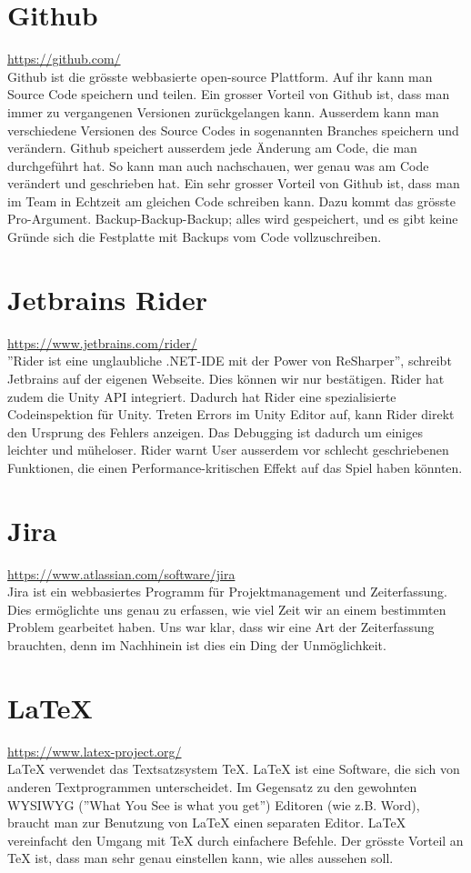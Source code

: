 \section{Github}
\url{https://github.com/}\\
Github ist die grösste webbasierte open-source Plattform. Auf ihr kann man Source Code speichern und teilen. Ein grosser Vorteil von Github ist, dass man immer zu vergangenen Versionen zurückgelangen kann.
Ausserdem kann man verschiedene Versionen des Source Codes in sogenannten Branches speichern und verändern. Github speichert ausserdem jede Änderung am Code, die man durchgeführt hat. So kann man auch nachschauen,
wer genau was am Code verändert und geschrieben hat. Ein sehr grosser Vorteil von Github ist, dass man im Team in Echtzeit am gleichen Code schreiben kann. Dazu kommt das grösste Pro-Argument. Backup-Backup-Backup; 
alles wird gespeichert, und es gibt keine Gründe sich die Festplatte mit Backups vom Code vollzuschreiben.


\section{Jetbrains Rider}
\url{https://www.jetbrains.com/rider/}\\
''Rider ist eine unglaubliche .NET-IDE mit der Power von ReSharper'', schreibt Jetbrains auf der eigenen Webseite. Dies können wir nur bestätigen. Rider hat zudem die Unity API integriert. Dadurch hat Rider eine
spezialisierte Codeinspektion für Unity. Treten Errors im Unity Editor auf, kann Rider direkt den Ursprung des Fehlers anzeigen. Das Debugging ist dadurch um einiges leichter und müheloser. 
Rider warnt User ausserdem vor schlecht geschriebenen Funktionen, die einen Performance-kritischen Effekt auf das Spiel haben könnten. 


\section{Jira}
\url{https://www.atlassian.com/software/jira}\\
Jira ist ein webbasiertes Programm für Projektmanagement und Zeiterfassung. Dies ermöglichte uns genau zu erfassen, wie viel Zeit wir an einem bestimmten Problem gearbeitet haben. Uns war klar, dass wir eine Art 
der Zeiterfassung brauchten, denn im Nachhinein ist dies ein Ding der Unmöglichkeit.

\section{LaTeX}
\url{https://www.latex-project.org/}\\
LaTeX verwendet das Textsatzsystem TeX. LaTeX ist eine Software, die sich von anderen Textprogrammen unterscheidet. Im Gegensatz zu den gewohnten WYSIWYG (''What You See is what you get'') Editoren (wie z.B. Word),
braucht man zur Benutzung von LaTeX einen separaten Editor. LaTeX vereinfacht den Umgang mit TeX durch einfachere Befehle. Der grösste Vorteil an TeX ist, dass man sehr genau einstellen kann, wie alles aussehen soll.


